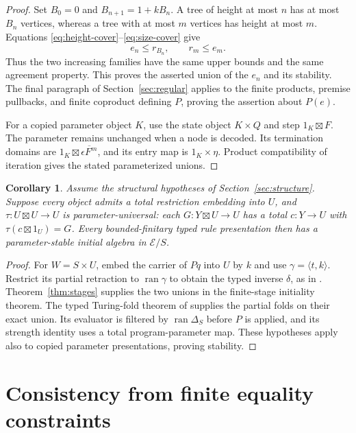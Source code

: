 \documentclass[11pt]{article}
\newtheorem{corollary}[theorem]{Corollary}
\theoremstyle{definition}\newtheorem{definition}[theorem]{Definition}
\theoremstyle{remark}\newtheorem{remark}[theorem]{Remark}
\newcommand{\E}{\mathscr E}
\newcommand{\ran}{\operatorname{ran}}
\begin{document}
\begin{proof}
Set $B_0=0$ and $B_{n+1}=1+kB_n$. A tree of height at most $n$
has at most $B_n$ vertices, whereas a tree with at most $m$
vertices has height at most $m$. Equations
\eqref{eq:height-cover}--\eqref{eq:size-cover} give
\[
 e_n\le r_{B_n},\qquad r_m\le e_m.
\]
Thus the two increasing families have the same upper bounds and
the same agreement property. This proves the asserted union of
the $e_n$ and its stability. The final paragraph of
Section~\ref{sec:regular} applies to the finite products, premise
pullbacks, and finite coproduct defining $P$, proving the assertion
about $P(e)$.

For a copied parameter object $K$, use the state object
$K\times Q$ and step $1_K\boxtimes F$. The parameter remains
unchanged when a node is decoded. Its termination domains are
$1_K\boxtimes\overline{\epsilon F^m}$, and its entry map is
$1_K\times\eta$. Product compatibility of iteration gives the
stated parameterized unions.
\end{proof}

\begin{corollary}\label{cor:initial}
Assume the structural hypotheses of Section~\ref{sec:structure}.
Suppose every object admits a total restriction embedding into $U$,
and $\tau:U\boxtimes U\to U$ is parameter-universal: each
$G:Y\boxtimes U\to U$ has a total $c:Y\to U$ with
$\tau(c\boxtimes1_U)=G$. Every bounded-finitary typed rule
presentation then has a parameter-stable initial algebra in $\E/S$.
\end{corollary}
\begin{proof}
For $W=S\times U$, embed the carrier of $Pq$ into $U$ by $k$
and use $\gamma=\langle t,k\rangle$. Restrict its partial
retraction to $\ran\gamma$ to obtain the typed inverse $\delta$,
as in \cite[Proposition~3.2]{FiniteProofs}. Theorem~\ref{thm:stages}
supplies the two unions in the finite-stage initiality theorem.
The typed Turing-fold theorem of \cite[Theorem~4.2]{FiniteProofs}
supplies the partial folds on their exact union. Its evaluator is
filtered by $\ran\Delta_S$ before $P$ is applied, and its strength
identity uses a total program-parameter map. These hypotheses apply
also to copied parameter presentations, proving stability.
\end{proof}

\section{Consistency from finite equality constraints}\label{sec:consistency}
\end{document}
